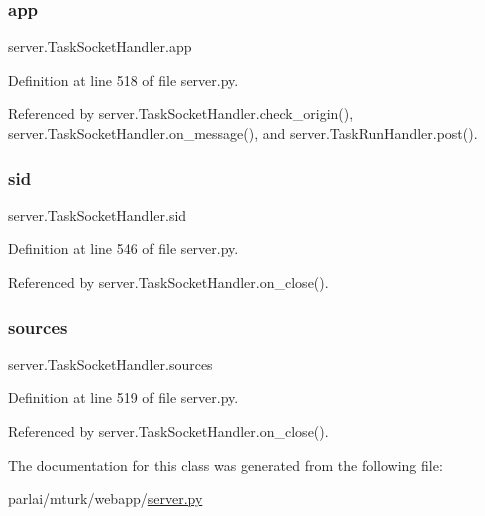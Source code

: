 \subsubsection{\texorpdfstring{app}{app}}
{\footnotesize\ttfamily server.\+Task\+Socket\+Handler.\+app}



Definition at line 518 of file server.\+py.



Referenced by server.\+Task\+Socket\+Handler.\+check\+\_\+origin(), server.\+Task\+Socket\+Handler.\+on\+\_\+message(), and server.\+Task\+Run\+Handler.\+post().

\mbox{\label{classserver_1_1TaskSocketHandler_adf9dedcdbc523b8f07b61c155a6fc7d6}} 
\subsubsection{\texorpdfstring{sid}{sid}}
{\footnotesize\ttfamily server.\+Task\+Socket\+Handler.\+sid}



Definition at line 546 of file server.\+py.



Referenced by server.\+Task\+Socket\+Handler.\+on\+\_\+close().

\mbox{\label{classserver_1_1TaskSocketHandler_a8edc3b231710027221b9251c18eaab60}} 
\subsubsection{\texorpdfstring{sources}{sources}}
{\footnotesize\ttfamily server.\+Task\+Socket\+Handler.\+sources}



Definition at line 519 of file server.\+py.



Referenced by server.\+Task\+Socket\+Handler.\+on\+\_\+close().



The documentation for this class was generated from the following file\+:\begin{DoxyCompactItemize}
\item 
parlai/mturk/webapp/\hyperlink{server_8py}{server.\+py}\end{DoxyCompactItemize}
